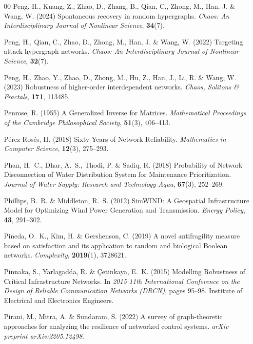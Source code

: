 \documentclass{comnet-mod}
\begin{document}
\begin{thebibliography}{00}
Peng, H., Kuang, Z., Zhao, D., Zhang, B., Qian, C., Zhong, M., Han, J. {\&}
  Wang, W. (2024)  Spontaneous recovery in random hypergraphs. {\em {Chaos: An
  Interdisciplinary Journal of Nonlinear Science}}, \textbf{34}(7).

Peng, H., Qian, C., Zhao, D., Zhong, M., Han, J. {\&} Wang, W. (2022)
  Targeting attack hypergraph networks. {\em {Chaos: An Interdisciplinary
  Journal of Nonlinear Science}}, \textbf{32}(7).

Peng, H., Zhao, Y., Zhao, D., Zhong, M., Hu, Z., Han, J., Li, R. {\&} Wang, W.
  (2023)  Robustness of higher-order interdependent networks. {\em {Chaos,
  Solitons \& Fractals}}, \textbf{171}, 113485.

Penrose, R. (1955)  {A Generalized Inverse for Matrices}. {\em {Mathematical
  Proceedings of the Cambridge Philosophical Society}}, \textbf{51}(3),
  406--413.

{P{\'e}rez-Ros{\'e}s}, H. (2018)  {Sixty Years of Network Reliability}. {\em
  {Mathematics in Computer Science}}, \textbf{12}(3), 275--293.

Phan, H.~C., Dhar, A.~S., Thodi, P. {\&} Sadiq, R. (2018)  {Probability of
  Network Disconnection of Water Distribution System for Maintenance
  Prioritization}. {\em {Journal of Water Supply: Research and
  Technology-Aqua}}, \textbf{67}(3), 252--269.

Phillips, B.~R. {\&} Middleton, R.~S. (2012)  {{{SimWIND}}: {{A}} Geospatial
  Infrastructure Model for Optimizing Wind Power Generation and Transmission}.
  {\em {Energy Policy}}, \textbf{43}, 291--302.

Pineda, O.~K., Kim, H. {\&} Gershenson, C. (2019)  A novel antifragility
  measure based on satisfaction and its application to random and biological
  Boolean networks. {\em Complexity}, \textbf{2019}(1), 3728621.

Pinnaka, S., Yarlagadda, R. {\&} {\c C}etinkaya, E.~K. (2015)  {Modelling
  Robustness of Critical Infrastructure Networks}. In {\em {2015 11th
  International Conference on the Design of Reliable Communication Networks
  ({{DRCN}})}}, pages 95--98. {Institute of Electrical and Electronics
  Engineers}.

Pirani, M., Mitra, A. {\&} Sundaram, S. (2022)  A survey of graph-theoretic
  approaches for analyzing the resilience of networked control systems. {\em
  {arXiv preprint arXiv:2205.12498}}.


\end{thebibliography}
\end{document}

